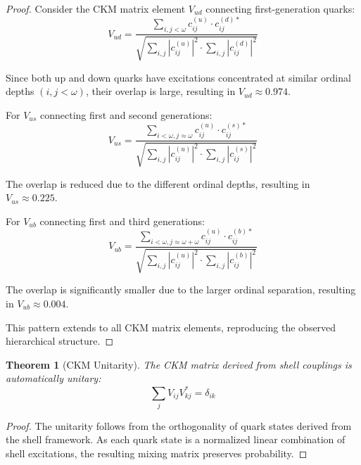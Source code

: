 \documentclass[12pt,a4paper]{article}
\newtheorem{theorem}{Theorem}[section]
\begin{document}
\begin{proof}
Consider the CKM matrix element $V_{ud}$ connecting first-generation quarks:
\begin{equation}
V_{ud} = \frac{\sum_{i,j < \omega} c_{ij}^{(u)} \cdot c_{ij}^{(d)*}}{\sqrt{\sum_{i,j} |c_{ij}^{(u)}|^2 \cdot \sum_{i,j} |c_{ij}^{(d)}|^2}}
\end{equation}

Since both up and down quarks have excitations concentrated at similar ordinal depths $(i,j < \omega)$, their overlap is large, resulting in $V_{ud} \approx 0.974$.

For $V_{us}$ connecting first and second generations:
\begin{equation}
V_{us} = \frac{\sum_{i < \omega, j \approx \omega} c_{ij}^{(u)} \cdot c_{ij}^{(s)*}}{\sqrt{\sum_{i,j} |c_{ij}^{(u)}|^2 \cdot \sum_{i,j} |c_{ij}^{(s)}|^2}}
\end{equation}

The overlap is reduced due to the different ordinal depths, resulting in $V_{us} \approx 0.225$.

For $V_{ub}$ connecting first and third generations:
\begin{equation}
V_{ub} = \frac{\sum_{i < \omega, j \approx \omega+\omega} c_{ij}^{(u)} \cdot c_{ij}^{(b)*}}{\sqrt{\sum_{i,j} |c_{ij}^{(u)}|^2 \cdot \sum_{i,j} |c_{ij}^{(b)}|^2}}
\end{equation}

The overlap is significantly smaller due to the larger ordinal separation, resulting in $V_{ub} \approx 0.004$.

This pattern extends to all CKM matrix elements, reproducing the observed hierarchical structure.
\end{proof}

\begin{theorem}[CKM Unitarity]
\label{thm:ckm-unitarity}
The CKM matrix derived from shell couplings is automatically unitary:
\begin{equation}
\sum_j V_{ij} V_{kj}^* = \delta_{ik}
\end{equation}
\end{theorem}

\begin{proof}
The unitarity follows from the orthogonality of quark states derived from the shell framework. As each quark state is a normalized linear combination of shell excitations, the resulting mixing matrix preserves probability.
\end{proof}
\end{document}
